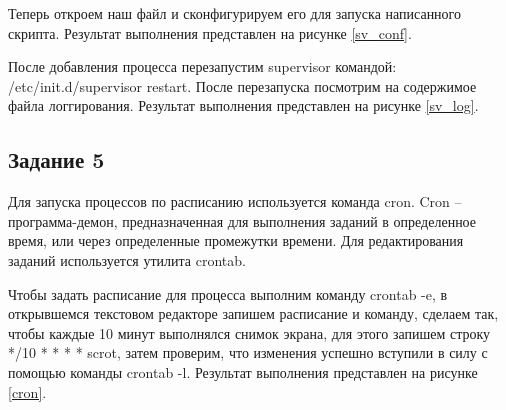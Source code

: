 Теперь откроем наш файл и сконфигурируем его для запуска написанного скрипта. Результат выполнения представлен на рисунке \ref{sv_conf}.  


После добавления процесса перезапустим supervisor командой: /etc/init.d/supervisor restart. После перезапуска посмотрим на содержимое файла логгирования. Результат выполнения представлен на рисунке \ref{sv_log}.


\subsection{Задание 5}
Для запуска процессов по расписанию используется команда cron. Cron – программа-демон, предназначенная для выполнения заданий в определенное время, или через определенные промежутки времени. Для редактирования заданий используется утилита crontab. 

Чтобы задать расписание для процесса выполним команду crontab -e, в открывшемся текстовом редакторе запишем расписание и команду, сделаем так, чтобы каждые 10 минут выполнялся снимок экрана, для этого запишем строку */10 * * * * scrot, затем проверим, что изменения успешно вступили в силу с помощью команды crontab -l. Результат выполнения представлен на рисунке \ref{cron}.

